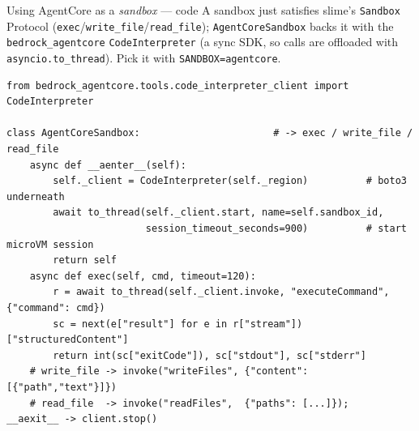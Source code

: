 \documentclass[aspectratio=169]{beamer}
\begin{document}
\begin{frame}[fragile]{Using AgentCore as a \emph{sandbox} --- code}
  \footnotesize A sandbox just satisfies slime's \texttt{Sandbox} Protocol
  (\texttt{exec}/\texttt{write\_file}/\texttt{read\_file}); \texttt{AgentCoreSandbox} backs it with the
  \texttt{bedrock\_agentcore} \texttt{CodeInterpreter} (a sync SDK, so calls are offloaded with
  \texttt{asyncio.to\_thread}). Pick it with \texttt{SANDBOX=agentcore}.
\begin{lstlisting}[basicstyle=\ttfamily\scriptsize]
from bedrock_agentcore.tools.code_interpreter_client import CodeInterpreter

class AgentCoreSandbox:                       # -> exec / write_file / read_file
    async def __aenter__(self):
        self._client = CodeInterpreter(self._region)          # boto3 underneath
        await to_thread(self._client.start, name=self.sandbox_id,
                        session_timeout_seconds=900)          # start microVM session
        return self
    async def exec(self, cmd, timeout=120):
        r = await to_thread(self._client.invoke, "executeCommand", {"command": cmd})
        sc = next(e["result"] for e in r["stream"])["structuredContent"]
        return int(sc["exitCode"]), sc["stdout"], sc["stderr"]
    # write_file -> invoke("writeFiles", {"content": [{"path","text"}]})
    # read_file  -> invoke("readFiles",  {"paths": [...]});   __aexit__ -> client.stop()
\end{lstlisting}
\end{frame}
\end{document}
